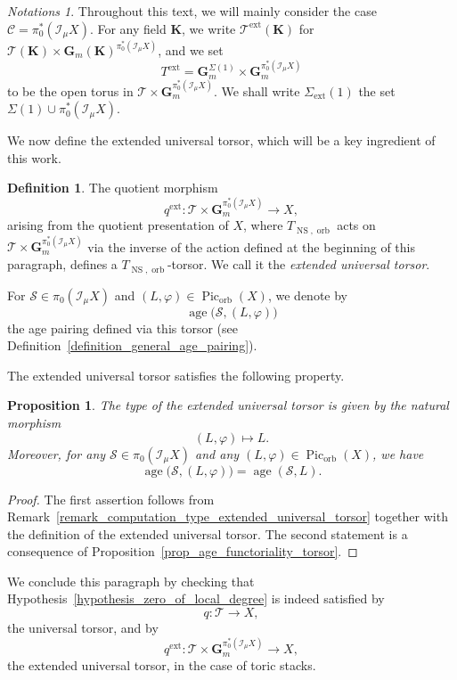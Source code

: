 \documentclass{proc-l}
\newcommand{\K}{\mathbf{K}}
\newcommand{\G}{\mathbf{G}}
\DeclareMathOperator{\Pic}{Pic}
\DeclareMathOperator{\age}{age}
\DeclareMathOperator{\NS}{NS}
\DeclareMathOperator{\orb}{orb}
\DeclareMathOperator{\ext}{ext}
\newcommand{\stackS}{\mathcal{S}}
\newcommand{\stackT}{\mathcal{T}}
\newcommand{\sheafI}{\mathcal{I}}
\newcommand{\sector}{\pi_0(\sheafI_{\mu} X)}
\newcommand{\twistsector}{\pi_0^*(\sheafI_{\mu} X)}
\newtheorem{prop}[theorem]{Proposition}
\theoremstyle{definition}
\newtheorem{definition}[theorem]{Definition}
\theoremstyle{remark}
\newtheorem{Notations}[theorem]{Notations}
\numberwithin{equation}{section}
\begin{document}
\begin{Notations}\label{notation_extended_torus_fan}
Throughout this text, we will mainly consider the case $\mathcal{C} = \twistsector$.  
For any field $\K$, we write $\stackT^{\ext}(\K)$ for $\stackT(\K) \times \G_m(\K)^{\twistsector}$, and we set
\[
T^{\ext} = \G_m^{\Sigma(1)} \times \G_m^{\twistsector}
\]
to be the open torus in $\stackT \times \G_m^{\twistsector}$. We shall write $\Sigma_{\ext}(1)$ the set $\Sigma(1) \cup \twistsector$.
\end{Notations}

We now define the extended universal torsor, which will be a key ingredient of this work.

\begin{definition}\label{definition_extended_universal_torsor}
The quotient morphism
\[
q^{\ext} : \stackT \times \G_m^{\twistsector} \longrightarrow X,
\]
arising from the quotient presentation of $X$, where $T_{\NS,\orb}$ acts on
$\stackT \times \G_m^{\twistsector}$ via the inverse of the action defined at the
beginning of this paragraph, defines a $T_{\NS,\orb}$-torsor. We call it the
\emph{extended universal torsor}.

For $\stackS \in \sector$ and $(L,\varphi) \in \Pic_{\orb}(X)$, we denote by
\[
\age\bigl(\stackS,(L,\varphi)\bigr)
\]
the age pairing defined via this torsor (see Definition~\ref{definition_general_age_pairing}).
\end{definition}

The extended universal torsor satisfies the following property.

\begin{prop}\label{proposition_functoriality_age}
The type of the extended universal torsor is given by the natural morphism
\[
(L,\varphi) \longmapsto L.
\]
Moreover, for any $\stackS \in \sector$ and any $(L,\varphi) \in \Pic_{\orb}(X)$, we have
\[
\age\bigl(\stackS,(L,\varphi)\bigr) = \age(\stackS,L).
\]
\end{prop}

\begin{proof}
The first assertion follows from Remark~\ref{remark_computation_type_extended_universal_torsor}
together with the definition of the extended universal torsor. The second statement
is a consequence of Proposition~\ref{prop_age_functoriality_torsor}.
\end{proof}


We conclude this paragraph by checking that Hypothesis~\ref{hypothesis_zero_of_local_degree} is indeed satisfied by
\[
q : \stackT \longrightarrow X,
\]
the universal torsor, and by
\[
q^{\ext} : \stackT \times \G_m^{\twistsector} \longrightarrow X,
\]
the extended universal torsor, in the case of toric stacks.
\end{document}
